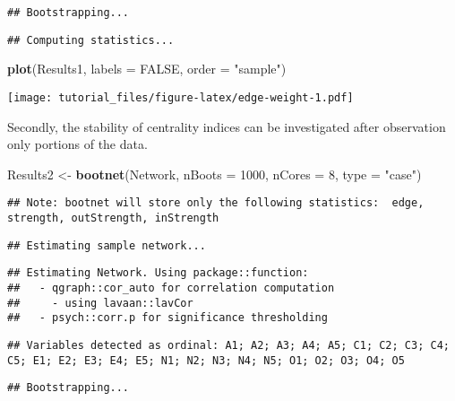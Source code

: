 \documentclass[]{article}
\newenvironment{Shaded}{\begin{snugshade}}{\end{snugshade}}
\newcommand{\KeywordTok}[1]{\textcolor[rgb]{0.13,0.29,0.53}{\textbf{#1}}}
\newcommand{\DataTypeTok}[1]{\textcolor[rgb]{0.13,0.29,0.53}{#1}}
\newcommand{\DecValTok}[1]{\textcolor[rgb]{0.00,0.00,0.81}{#1}}
\newcommand{\StringTok}[1]{\textcolor[rgb]{0.31,0.60,0.02}{#1}}
\newcommand{\OtherTok}[1]{\textcolor[rgb]{0.56,0.35,0.01}{#1}}
\newcommand{\NormalTok}[1]{#1}
\begin{document}
\begin{verbatim}
## Bootstrapping...
\end{verbatim}

\begin{verbatim}
## Computing statistics...
\end{verbatim}

\begin{Shaded}
\begin{Highlighting}[]
\KeywordTok{plot}\NormalTok{(Results1, }\DataTypeTok{labels =} \OtherTok{FALSE}\NormalTok{, }\DataTypeTok{order =} \StringTok{"sample"}\NormalTok{)}
\end{Highlighting}
\end{Shaded}

\texttt{[image: tutorial\_files/figure-latex/edge-weight-1.pdf]}

Secondly, the stability of centrality indices can be investigated after
observation only portions of the data.

\begin{Shaded}
\begin{Highlighting}[]
\NormalTok{Results2 <-}\StringTok{ }\KeywordTok{bootnet}\NormalTok{(Network, }\DataTypeTok{nBoots =} \DecValTok{1000}\NormalTok{, }\DataTypeTok{nCores =} \DecValTok{8}\NormalTok{, }\DataTypeTok{type =} \StringTok{"case"}\NormalTok{)}
\end{Highlighting}
\end{Shaded}

\begin{verbatim}
## Note: bootnet will store only the following statistics:  edge, strength, outStrength, inStrength
\end{verbatim}

\begin{verbatim}
## Estimating sample network...
\end{verbatim}

\begin{verbatim}
## Estimating Network. Using package::function:
##   - qgraph::cor_auto for correlation computation
##     - using lavaan::lavCor
##   - psych::corr.p for significance thresholding
\end{verbatim}

\begin{verbatim}
## Variables detected as ordinal: A1; A2; A3; A4; A5; C1; C2; C3; C4; C5; E1; E2; E3; E4; E5; N1; N2; N3; N4; N5; O1; O2; O3; O4; O5
\end{verbatim}

\begin{verbatim}
## Bootstrapping...
\end{verbatim}
\end{document}
